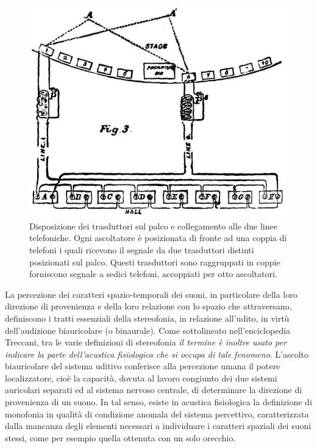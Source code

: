\begin{figure}[t]
\centering
\includegraphics[width=1\columnwidth]{CAPITOLI/1000/IMG/1881opr2.jpg}
\caption{Disposizione dei trasduttori sul palco e collegamento alle due linee
telefoniche. Ogni ascoltatore è posizionata di fronte ad una coppia di telefoni
i quali ricevono il segnale da due trasduttori distinti posizionati sul palco.
Questi trasduttori sono raggruppati in coppie forniscono segnale a sedici
telefoni, accoppiati per otto ascoltatori.}
\label{fig:teatrophone1}
\end{figure}

La percezione dei caratteri spazio-temporali dei suoni, in particolare della
loro direzione di provenienza e della loro relazione con lo spazio che
attraversano, definiscono i tratti essenziali della stereofonia, in relazione
all'udito, in virtù dell’audizione biauricolare (o binaurale). Come sottolineato
nell'enciclopedia Treccani, tra le varie definizioni di stereofonia \emph{il
termine è inoltre usato per indicare la parte dell’acustica fisiologica
che si occupa di tale fenomeno}. L'ascolto biauricolare del sistema uditivo
conferisce alla percezione umana il potere localizzatore, cioè la capacità,
dovuta al lavoro congiunto dei due sistemi auricolari separati ed al sistema
nervoso centrale, di determinare la direzione di provenienza di un suono. In tal
senso, esiste in acustica fisiologica la definizione di monofonia in qualità di
condizione anomala del sistema percettivo, caratterizzata dalla mancanza degli
elementi necessari a individuare i caratteri spaziali dei suoni stessi, come per
esempio quella ottenuta con un solo orecchio.

